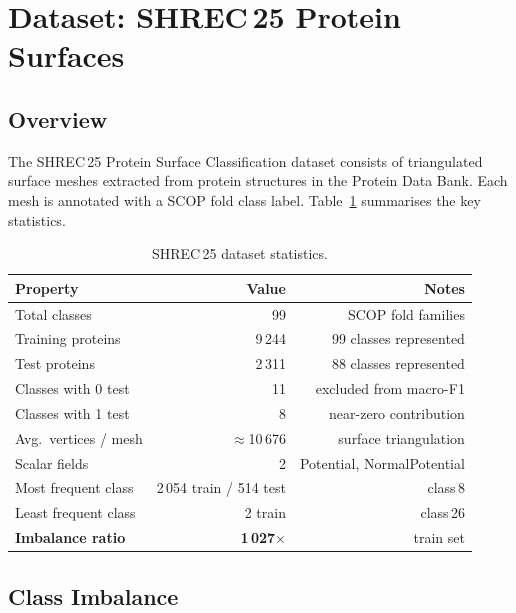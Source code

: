 \section{Dataset: SHREC\,25 Protein Surfaces}
\label{sec:dataset}

\subsection{Overview}

The SHREC\,25 Protein Surface Classification dataset consists of triangulated
surface meshes extracted from protein structures in the Protein Data Bank.
Each mesh is annotated with a SCOP fold class label.
Table~\ref{tab:dataset_stats} summarises the key statistics.

\begin{table}[h]
  \centering
  \caption{SHREC\,25 dataset statistics.}
  \label{tab:dataset_stats}
  \begin{tabular}{lrr}
    \toprule
    \textbf{Property} & \textbf{Value} & \textbf{Notes} \\
    \midrule
    Total classes          & 99  & SCOP fold families \\
    Training proteins      & 9\,244  & 99 classes represented \\
    Test proteins          & 2\,311  & 88 classes represented \\
    Classes with 0 test    & 11  & excluded from macro-F1 \\
    Classes with 1 test    & 8   & near-zero contribution \\
    \midrule
    Avg.\ vertices / mesh  & $\approx$10\,676 & surface triangulation \\
    Scalar fields          & 2   & Potential, NormalPotential \\
    \midrule
    Most frequent class    & 2\,054 train / 514 test & class\,8 \\
    Least frequent class   & 2 train & class\,26 \\
    \textbf{Imbalance ratio} & \textbf{1\,027$\times$} & train set \\
    \bottomrule
  \end{tabular}
\end{table}

\subsection{Class Imbalance}

